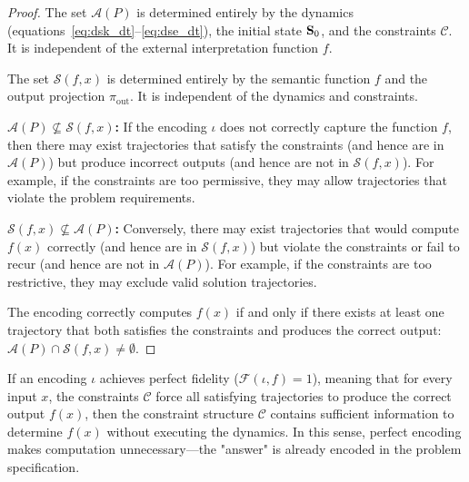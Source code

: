 \begin{proof}
The set $\mathcal{A}(P)$ is determined entirely by the dynamics (equations~\eqref{eq:dsk_dt}--\eqref{eq:dse_dt}), the initial state $\mathbf{S}_0$, and the constraints $\mathcal{C}$. It is independent of the external interpretation function $f$.

The set $\mathcal{S}(f, x)$ is determined entirely by the semantic function $f$ and the output projection $\pi_{\text{out}}$. It is independent of the dynamics and constraints.

\textbf{$\mathcal{A}(P) \not\subseteq \mathcal{S}(f, x)$:} If the encoding $\iota$ does not correctly capture the function $f$, then there may exist trajectories that satisfy the constraints (and hence are in $\mathcal{A}(P)$) but produce incorrect outputs (and hence are not in $\mathcal{S}(f, x)$). For example, if the constraints are too permissive, they may allow trajectories that violate the problem requirements.

\textbf{$\mathcal{S}(f, x) \not\subseteq \mathcal{A}(P)$:} Conversely, there may exist trajectories that would compute $f(x)$ correctly (and hence are in $\mathcal{S}(f, x)$) but violate the constraints or fail to recur (and hence are not in $\mathcal{A}(P)$). For example, if the constraints are too restrictive, they may exclude valid solution trajectories.

The encoding correctly computes $f(x)$ if and only if there exists at least one trajectory that both satisfies the constraints and produces the correct output: $\mathcal{A}(P) \cap \mathcal{S}(f, x) \neq \emptyset$.
\end{proof}

\begin{corollary}
\label{cor:perfect_encoding}
If an encoding $\iota$ achieves perfect fidelity ($\mathcal{F}(\iota, f) = 1$), meaning that for every input $x$, the constraints $\mathcal{C}$ force all satisfying trajectories to produce the correct output $f(x)$, then the constraint structure $\mathcal{C}$ contains sufficient information to determine $f(x)$ without executing the dynamics. In this sense, perfect encoding makes computation unnecessary—the "answer" is already encoded in the problem specification.
\end{corollary}

